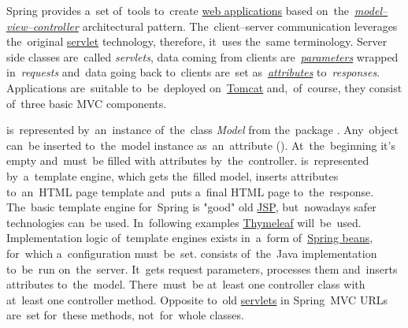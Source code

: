 
Spring provides a~set of~tools to~create \hyperref[webserviceapplication]{web applications} based on~the~\hyperref[mvc]{\textit{model--view--controller}} architectural pattern.
The~client--server communication leverages the~original \hyperref[servlet]{servlet} technology, therefore, it~uses the~same terminology.
Server side classes are~called \textit{servlets}, data coming from clients are~\hyperref[jspattributeparameter]{\textit{parameters}} wrapped in~\textit{requests} and~data going back to~clients are~set as~\hyperref[jspattributeparameter]{\textit{attributes}} to~\textit{responses}.
Applications are~suitable to~be~deployed on~\hyperref[tomcat]{Tomcat} and,~of~course, they consist of~three basic MVC components.

\begin{itemize}
     is~represented by~an~instance of~the~class \textit{Model} from the~package .
            Any~object can~be inserted to~the~model instance as~an~attribute ().
            At~the~beginning it's empty and~must~be filled with attributes by~the~controller.
     is~represented by~a~template engine, which gets the~filled model, inserts attributes to~an~HTML page template and~puts a~final HTML page to~the~response.
            The~basic template engine for~Spring is "good" old \hyperref[jsp]{JSP}, but~nowadays safer technologies can~be used.
            In~following examples \href{https://www.thymeleaf.org/}{Thymeleaf} will~be~used.
            Implementation logic of~template engines exists in~a~form of~\hyperref[springinversionofcontrol]{Spring beans}, for~which a~configuration must~be~set.
     consists of~the~Java implementation to~be~run on~the~server.
            It~gets request parameters, processes them and~inserts attributes to~the~model.
            There~must~be at~least one controller class with at~least one controller method.
            Opposite to~old \hyperref[servlet]{servlets} in Spring~MVC URLs are~set for~these methods, not~for~whole classes.
\end{itemize}
\newpage

\newpage
